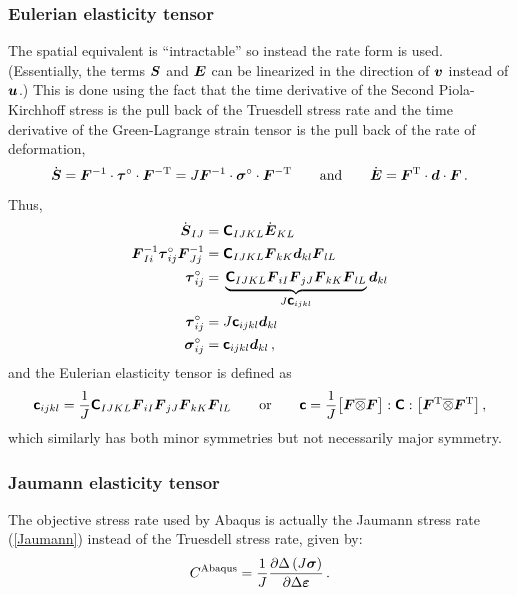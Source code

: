 \documentclass[10pt,letterpaper,oneside]{report}
\newcommand{\ten}[1]{\mbox{\boldmath $#1$}{}}
\newcommand{\tenf}[1]{\mbox{{\sffamily{\bfseries {#1}}}}}
\newcommand{\scas}[1]{\mbox{{\scriptsize{${\rm{#1}}$}}}{}}
\begin{document}
\subsubsection{Eulerian elasticity tensor}
The spatial equivalent is ``intractable'' so instead the rate form is used.  (Essentially, the terms $\ten{S}$ and $\ten{E}$ can be linearized in the direction of $\ten{v}$ instead of $\ten{u}$.)  This is done using the fact that the time derivative of the Second Piola-Kirchhoff stress is the pull back of the Truesdell stress rate and the time derivative of the Green-Lagrange strain tensor is the pull back of the rate of deformation,
\begin{equation}
\dot{\ten{S}}  
= \ten{F}^{-1} \cdot \ten{ \tau }^{\circ} \cdot \ten{F}^{-\scas{T}} 
= J \ten{F}^{-1} \cdot \ten{ \sigma }^{\circ} \cdot \ten{F}^{-\scas{T}}
\qquad \text{and} \qquad 
\dot{\ten{E}} = \ten{F}^{\scas{T}} \cdot \ten{d} \cdot \ten{F} \, .
\end{equation}
Thus, 
\begin{align}
\dot{\ten{S}}_{IJ} ={}& \tenf{C}_{IJKL} \dot{\ten{E}}_{KL}
\\
\ten{F}^{-1}_{Ii} \ten{ \tau }^{\circ}_{ij} \ten{F}^{-1}_{Jj} ={}& \tenf{C}_{IJKL} \ten{F}_{kK} \ten{d}_{kl} \ten{F}_{lL}
\notag \\
\ten{ \tau }^{\circ}_{ij} ={}& \underbrace{ \tenf{C}_{IJKL} \ten{F}_{iI} \ten{F}_{jJ} \ten{F}_{kK} \ten{F}_{lL} }_{J \tenf{c}_{ijkl}}  \ten{d}_{kl}
\notag \\
\ten{ \tau }^{\circ}_{ij} ={}& J \tenf{c}_{ijkl} \ten{d}_{kl} 
\\
\ten{ \sigma }^{\circ}_{ij} ={}& \tenf{c}_{ijkl} \ten{d}_{kl} \, ,
\end{align}
and the Eulerian elasticity tensor is defined as
\begin{equation}
\tenf{c}_{ijkl} = \frac{1}{J} \tenf{C}_{IJKL} \ten{F}_{iI} \ten{F}_{jJ} \ten{F}_{kK} \ten{F}_{lL} 
\qquad \text{or} \qquad
\tenf{c}  = \frac{1}{J} \big[ \ten{F} \overline{\otimes} \ten{F} \big] : \tenf{C} : \big[ \ten{F}^{\scas{T}} \overline{\otimes} \ten{F}^{\scas{T}} \big] \, , 
\end{equation}
which similarly has both minor symmetries but not necessarily major symmetry.  


\subsubsection{Jaumann elasticity tensor}
The objective stress rate used by Abaqus is actually the Jaumann stress rate (\autoref{Jaumann}) instead of the Truesdell stress rate, given by: 
\begin{equation}
{C}^{\scas{Abaqus}} = \frac{1}{J} \frac{\partial \Delta \left( J \ten{\sigma} \right)}{\partial \Delta \ten{\varepsilon}} \, .
\end{equation}
\end{document}
